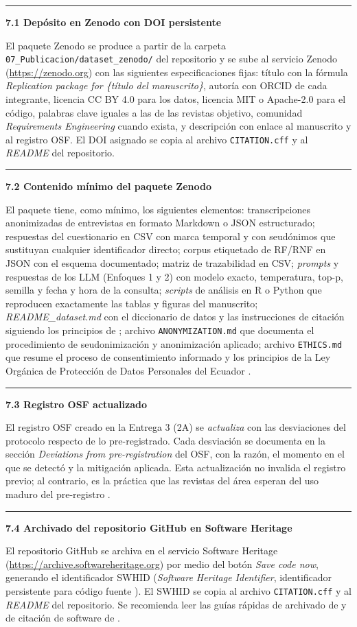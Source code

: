 \documentclass[11pt,a4paper]{article}
\newcounter{secc}
\newcommand{\submark}[1]{\par\vspace{4pt}\noindent
    {\color{uteqgreen}\rule[-1pt]{3.5pt}{12pt}}\hspace{6pt}\textbf{\color{uteqgreen}#1}\par\vspace{2pt}}
\begin{document}
\submark{7.1 Depósito en Zenodo con DOI persistente}
El paquete Zenodo se produce a partir de la carpeta \texttt{07\_Publicacion/dataset\_zenodo/} del repositorio y se sube al servicio Zenodo (\url{https://zenodo.org}) con las siguientes especificaciones fijas: título con la fórmula \emph{Replication package for \{título del manuscrito\}}, autoría con ORCID de cada integrante, licencia CC BY 4.0 para los datos, licencia MIT o Apache-2.0 para el código, palabras clave iguales a las de las revistas objetivo, comunidad \emph{Requirements Engineering} cuando exista, y descripción con enlace al manuscrito y al registro OSF.
El DOI asignado se copia al archivo \texttt{CITATION.cff} y al \emph{README} del repositorio.

\submark{7.2 Contenido mínimo del paquete Zenodo}
El paquete tiene, como mínimo, los siguientes elementos: transcripciones anonimizadas de entrevistas en formato Markdown o JSON estructurado; respuestas del cuestionario en CSV con marca temporal y con seudónimos que sustituyan cualquier identificador directo; corpus etiquetado de RF/RNF en JSON con el esquema documentado; matriz de trazabilidad en CSV; \emph{prompts} y respuestas de los LLM (Enfoques 1 y 2) con modelo exacto, temperatura, top-p, semilla y fecha y hora de la consulta; \emph{scripts} de análisis en R o Python que reproducen exactamente las tablas y figuras del manuscrito; \emph{README\_dataset.md} con el diccionario de datos y las instrucciones de citación siguiendo los principios de \cite{smith2016force11}; archivo \texttt{ANONYMIZATION.md} que documenta el procedimiento de seudonimización y anonimización aplicado; archivo \texttt{ETHICS.md} que resume el proceso de consentimiento informado y los principios de la Ley Orgánica de Protección de Datos Personales del Ecuador \cite{ley_datos_ecuador_2021}.

\submark{7.3 Registro OSF actualizado}
El registro OSF creado en la Entrega 3 (2A) se \emph{actualiza} con las desviaciones del protocolo respecto de lo pre-registrado.
Cada desviación se documenta en la sección \emph{Deviations from pre-registration} del OSF, con la razón, el momento en el que se detectó y la mitigación aplicada.
Esta actualización no invalida el registro previo; al contrario, es la práctica que las revistas del área esperan del uso maduro del pre-registro \cite{nosek2018preregistration}.

\submark{7.4 Archivado del repositorio GitHub en Software Heritage}
El repositorio GitHub se archiva en el servicio Software Heritage (\url{https://archive.softwareheritage.org}) por medio del botón \emph{Save code now}, generando el identificador SWHID (\emph{Software Heritage Identifier}, identificador persistente para código fuente \cite{dicosmo2020swhid}).
El SWHID se copia al archivo \texttt{CITATION.cff} y al \emph{README} del repositorio.
Se recomienda leer las guías rápidas de archivado de \cite{dicosmo2018swh} y de citación de software de \cite{smith2016force11}.
\end{document}
